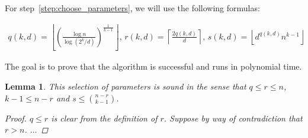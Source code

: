 \documentclass[12pt]{article}
\newtheorem{lemma}[thm]{Lemma}
\begin{document}
    For step~\ref{step:choose_parameters}, we will use the following formulas:

    \begin{align*}
            q(k, d) = \left\lfloor \left(  \frac{\log n}{\log (2^k/d)} \right)^{\frac{1}{k-1}} \right\rfloor,\,
            r(k, d) = \left \lceil \frac{2q(k, d)}{d} \right \rceil,\,
            s(k, d) = \left\lfloor d^{q(k, d)} n^{k-1} \right\rfloor
    \end{align*}

    The goal is to prove that the algorithm is successful and runs in polynomial time.

    \begin{lemma}
        This selection of parameters is sound in the sense that $q  \leq r \leq n$, $k - 1 \leq n - r$ and $s \leq \binom{n - r}{k - 1}$.

        \begin{proof}
            $q \leq r$ is clear from the definition of $r$.
            Suppose by way of contradiction that $r > n$. \color{red} $\ldots$ %



        \end{proof}

    \end{lemma}
\end{document}
